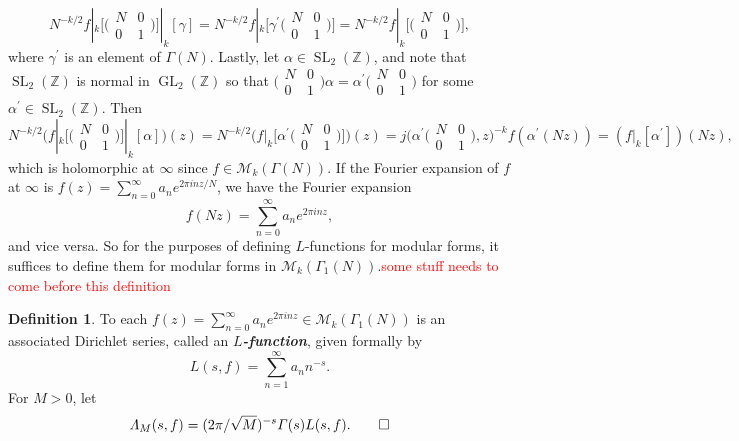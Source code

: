 \documentclass[10pt,leqno,twoside]{article}
\theoremstyle{plain}
\theoremstyle{definition}
\newtheorem{definition/}[lem]{Definition}
\newenvironment{definition}
  {\renewcommand{\qedsymbol}{\textdagger}%
   \pushQED{\qed}\begin{definition/}}
  {\popQED\end{definition/}}
\numberwithin{equation}{section}
\numberwithin{lem}{section}
\newcommand{\textib}[1]{\textbf{\textit{#1\index{#1}}}} %
\DeclareMathOperator{\GL}{GL}
\DeclareMathOperator{\SL}{SL}
\newcommand{\slz}{\SL_2(\mathbb{Z})}
\newcommand{\sai}[1]{\textcolor{red}{#1}}
\begin{document}
\[N^{-k/2}f|_k\big[\big(\!\begin{smallmatrix}
    N & 0 \\ 0 & 1
\end{smallmatrix}\!\big)\big]|_k[\gamma] = N^{-k/2}f|_k\big[\gamma^\prime\big(\!\begin{smallmatrix}
    N & 0 \\ 0 & 1
\end{smallmatrix}\!\big)\big] = N^{-k/2}f|_k\big[\big(\!\begin{smallmatrix}
    N & 0 \\ 0 & 1
\end{smallmatrix}\!\big)\big],\] where $\gamma^\prime$ is an element of $\varGamma(N)$. Lastly, let $\alpha\in \slz$, and note that $\slz$ is normal in $\GL_2(\mathbb Z)$ so that $\big(\!\begin{smallmatrix}
    N & 0 \\ 0 & 1
\end{smallmatrix}\!\big)\alpha = \alpha^\prime \big(\!\begin{smallmatrix}
    N & 0 \\ 0 & 1
\end{smallmatrix}\!\big)$ for some $\alpha^\prime\in\slz$. Then 
\[N^{-k/2}\Big(f|_k\big[\big(\!\begin{smallmatrix}
    N & 0 \\ 0 & 1
\end{smallmatrix}\!\big)\big]|_k[\alpha]\Big)(z) = N^{-k/2}\Big(f|_k\big[\alpha^\prime\big(\!\begin{smallmatrix}
    N & 0 \\ 0 & 1
\end{smallmatrix}\!\big)\big]\Big)(z) = j\big(\alpha^\prime\big(\!\begin{smallmatrix}
    N & 0 \\ 0 & 1
\end{smallmatrix}\!\big),z\big)^{-k}f(\alpha^\prime(Nz)) = (f|_k[\alpha^\prime])(Nz),\] which is holomorphic at $\infty$ since $f\in\mathcal M_k(\varGamma(N))$. If the Fourier expansion of $f$ at $\infty$ is $f(z) = \sum_{n =0}^\infty a_ne^{2\pi i n z/N}$, we have the Fourier expansion
\[f(Nz) = \sum_{n =0}^\infty a_ne^{2\pi i n z},\] and vice versa. So for the purposes of defining $L$-functions for modular forms, it suffices to define them for modular forms in $\mathcal M_k(\varGamma_1(N))$.\sai{some stuff needs to come before this definition}
\begin{definition}\label{def: L function}
    To each $f(z) = \sum_{n=0}^\infty a_ne^{2\pi i nz}\in\mathcal M_k(\varGamma_1(N))$ is an associated Dirichlet series, called an \textib{$L$-function}, given formally by
    \[L(s,f) = \sum_{n=1}^\infty a_nn^{-s}.\] For $M>0$, let 
    \[\varLambda_M(s,f) = (2\pi/\sqrt{M})^{-s}\varGamma(s)L(s,f).\qedhere\]
\end{definition}
\end{document}
